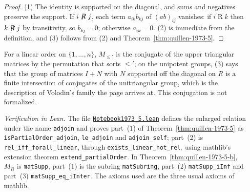 \begin{proof}
(1) The identity is supported on the diagonal, and sums and negatives preserve the support. If $i \not\mathrel{R} j$, each term $a_{ik} b_{kj}$ of $(ab)_{ij}$ vanishes: if $i \mathrel{R} k$ then $k \not\mathrel{R} j$ by transitivity, so $b_{kj} = 0$; otherwise $a_{ik} = 0$. (2) is immediate from the definition, and (3) follows from (2) and Theorem~\ref{thm:quillen-1973-5}.
\end{proof}

\noindent For a linear order on $\{1, \ldots, n\}$, $M_{\le'}$ is the conjugate of the upper triangular matrices by the permutation that sorts $\le'$; on the unipotent groups, (3) says that the group of matrices $I + N$ with $N$ supported off the diagonal on $R$ is a finite intersection of conjugates of the unitriangular group, which is the description of Volodin's family the page arrives at. This conjugation is not formalized.

\emph{Verification in Lean.} The file \href{\leanblobmain/Notebook1973_5.lean}{\texttt{Notebook1973\_5.\allowbreak{}lean}} defines the enlarged relation under the name \texttt{adjoin} and proves part~(1) of Theorem~\ref{thm:quillen-1973-5} as \texttt{isPartialOrder\_adjoin}, \texttt{le\_adjoin} and \texttt{adjoin\_self}; part~(2) is \texttt{rel\_iff\_forall\_linear}, through \texttt{exists\_linear\_not\_rel}, using mathlib's extension theorem \texttt{extend\_partialOrder}. In Theorem~\ref{thm:quillen-1973-5-b}, $M_R$ is \texttt{matSupp}, part~(1) is the subring \texttt{matSubring}, part~(2) \texttt{matSupp\_iInf} and part~(3) \texttt{matSupp\_eq\_iInter}. The axioms used are the three usual axioms of mathlib.

